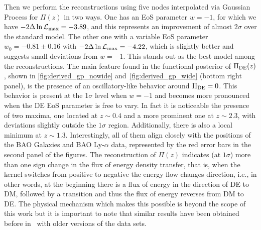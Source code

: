 \documentclass[twocolumn,a4paper,reprint,amssymb,aps,prd,groupedaddress,superscriptaddress,nofootinbib]{revtex4-2}
\begin{document}
Then we perform the reconstructions using five nodes interpolated via Gaussian Process for $\Pi(z)$ in two ways.
One has an EoS parameter $w = -1$, for which we have $-2\Delta \ln \mathcal{L_{\rm max}} = -3.89$,
and this represents an improvement of almost $2\sigma$ over the standard model. The other one with
a variable EoS parameter $w_0 = -0.81 \pm 0.16$  with $-2\Delta \ln \mathcal{L_{\rm max}} = -4.22$,
which is slightly better and suggests small deviations from $w=-1$.
This stands out as the best model among the reconstructions.
The main feature found in the functional posterior of $\Pi_{\rm DE}(z)$, shown in
\cref{fig:derived_gp_nowide} and~\cref{fig:derived_gp_wide} (bottom right panel), is the presence
of an oscillatory-like behavior around $\Pi_{\rm DE}=0$.
This behavior is present at the  1$\sigma$ level when $w=-1$ and becomes more pronounced when the DE EoS parameter is free to vary. In fact it is noticeable the presence
of two maxima, one located at $z\sim 0.4$ and a more prominent one at $z\sim 2.3$, with deviations slightly
outside the $1\sigma$ region. Additionally, there is also a local minimum at $z\sim 1.3$. Interestingly,
all of them align closely with the positions of the BAO Galaxies and BAO Ly-$\alpha$ data, represented
by the red error bars in the second panel of the figures.
The reconstruction of $\Pi(z)$ indicates (at $1\sigma$) more than one sign change in the flux of energy density
transfer, that is, when the kernel switches from positive to negative the energy flow changes direction,
i.e., in other words, at the beginning there is a flux of energy in the direction of  DE to DM, followed
by a transition and thus the flux of energy reverses from DM to DE.
%
The physical mechanism which makes this possible is beyond the scope of this work but it is important to note
that similar results have been obtained before in~\cite{Cai:2009ht} with older versions of the data sets.
\end{document}
